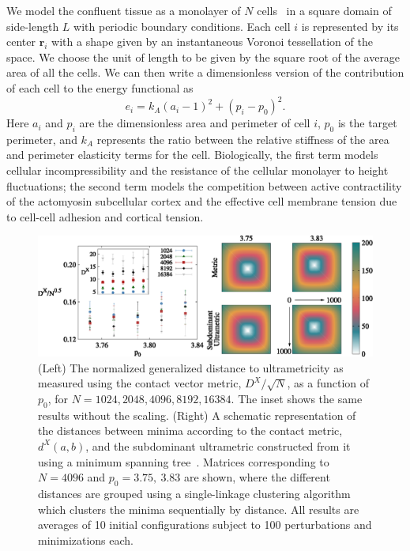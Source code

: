 \documentclass[reprint,amsmath,amssymb,aps]{revtex4-2}
\begin{document}
We model the confluent tissue as a monolayer of $N$ cells~\cite{Bi2016,Bi2014,Bi2015} in a square domain of side-length $L$ with periodic boundary conditions. Each cell $i$ is represented by its center $\textbf{r}_i$ with a shape given by an instantaneous Voronoi tessellation of the space. We choose the unit of length to be given by the square root of the average area of all the cells. We can then write a dimensionless version of the contribution of each cell to the energy functional as~\cite{Farhadifar2007,Fletcher2014,Merkel2018,Teomy2018a}
\begin{equation}\label{eq::en_func_reduced}
	e_i=k_A(a_i-1)^2+(p_i-p_{0})^2.
\end{equation}
Here $a_i$ and $p_i$ are the dimensionless area and perimeter of cell $i$, $p_0$ is the target perimeter, and $k_A$ represents the ratio between the relative stiffness of the area and perimeter elasticity terms for the cell. Biologically, the first term models cellular incompressibility and the resistance of the cellular monolayer to height fluctuations; the second term models the competition between active contractility of the actomyosin subcellular cortex and the effective cell membrane tension due to cell-cell adhesion and cortical tension.

\begin{figure}[t]
	\includegraphics{fig2.eps}
	\caption{\label{PosMetric} (Left) The normalized generalized distance to ultrametricity as measured using the contact vector metric, $D^X/\sqrt{N}$, as a function of  $p_0$, for $N=1024, 2048, 4096, 8192, 16384$. The inset shows the same results without the scaling. (Right) A schematic representation of the distances between minima according to the contact metric, $d^X(a,b)$, and the subdominant ultrametric constructed from it using a minimum spanning tree~\cite{Kruskal1956, Rammal1985}. Matrices corresponding to $N=4096$ and $p_0 = 3.75,\ 3.83$ are shown, where the different distances are grouped using a single-linkage clustering algorithm which clusters the minima sequentially by distance. All results are averages of 10 initial configurations subject to 100 perturbations and minimizations each.}
\end{figure}
\end{document}
